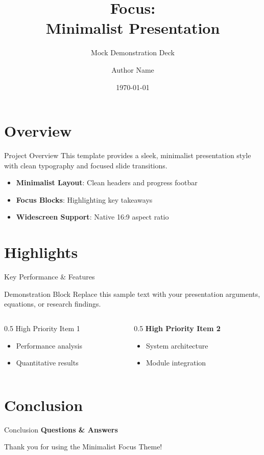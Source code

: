 \documentclass[aspectratio=169]{beamer}
\title{Focus: \\ Minimalist Presentation}
\subtitle{Mock Demonstration Deck}
\author{Author Name}
\institute{Research Institute \\ City, Country}
\date{\today}
\begin{document}
\begin{frame}
	\maketitle
\end{frame}

\section{Overview}

\begin{frame}{Project Overview}
	This template provides a sleek, minimalist presentation style with clean typography and focused slide transitions.
	\vfill
	\begin{itemize}
		\item \textbf{Minimalist Layout}: Clean headers and progress footbar
		\item \textbf{Focus Blocks}: Highlighting key takeaways
		\item \textbf{Widescreen Support}: Native 16:9 aspect ratio
	\end{itemize}
\end{frame}

\section{Highlights}

\begin{frame}{Key Performance \& Features}
	\begin{block}{Demonstration Block}
		Replace this sample text with your presentation arguments, equations, or research findings.
	\end{block}
	
	\vfill
	\begin{columns}[t]
		\begin{column}{0.5\textwidth}
			\alert{High Priority Item 1}
			\begin{itemize}
				\item Performance analysis
				\item Quantitative results
			\end{itemize}
		\end{column}
		\begin{column}{0.5\textwidth}
			\textbf{High Priority Item 2}
			\begin{itemize}
				\item System architecture
				\item Module integration
			\end{itemize}
		\end{column}
	\end{columns}
\end{frame}

\section{Conclusion}

\begin{frame}{Conclusion}
	\centering
	\Large \textbf{Questions \& Answers} \par
	\vspace{1.5em}
	\normalsize Thank you for using the Minimalist Focus Theme!
\end{frame}
\end{document}
